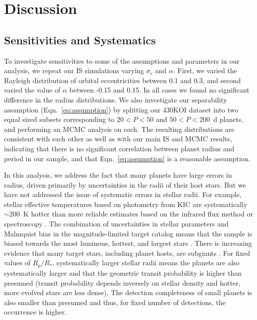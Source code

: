 
\section{Discussion}
\label{sec:discussion}

\subsection{Sensitivities and Systematics}
\label{sec:sensitivity}

To investigate sensitivities to some of the assumptions and parameters
in our analysis, we repeat our IS simulations varying $\sigma_e$ and $\alpha$. First,
we varied the Rayleigh distribution of orbital eccentricities between 0.1
and 0.3, and second varied the value of $\alpha$ between -0.15 and 0.15.  
In all cases we found no significant difference in the radius distributions. We also
investigate our separability assumption (Eqn.~\ref{eq:assumption}) by
splitting our 430KOI dataset into two equal sized subsets corresponding to $20<P<50$ and
$50<P<200$~d planets, and performing an MCMC analysis on each. 
The resulting distributions are consistent with each other as well as with our
main IS and MCMC results, indicating that there is no significant
correlation between planet radius and period in our sample, and
that Eqn.~\ref{eq:assumption} is a reasonable assumption.

In this analysis, we address the fact that many \kep{} planets
have large errors in radius, driven primarily
by uncertainties in the radii of their host stars.
But we have not addressed the issue of systematic errors
in stellar radii.  For example,
stellar effective temperatures based on photometry from KIC
\citep{Brown2011} are systematically $\sim$200~K hotter than more
reliable estimates based on the infrared flux method
\citep{Pinsonneault2012} or spectroscopy \citep{Gaidos2013}.  The
combination of uncertainties in stellar parameters and Malmquist bias
in the magnitude-limited \kep{} target catalog means that the
sample is biased towards the most luminous, hottest, and largest stars
\citep{GaidosMann2013}.  There is increasing evidence that many \kep{}
target stars, including planet hosts, are subgiants \citep[e.g.,
][]{Verner2011,Everett2013,Bastien2014}.  For fixed values of
$R_p/R_*$, systematically larger stellar radii means the planets
are also systematically larger and that the geometric transit
probability is higher than presumed (transit probability depends
inversely on stellar density and hotter, more evolved stars are less
dense).  The detection completeness of small planets is also smaller
than presumed and thus, for fixed number of detections, the occurrence
is higher.

